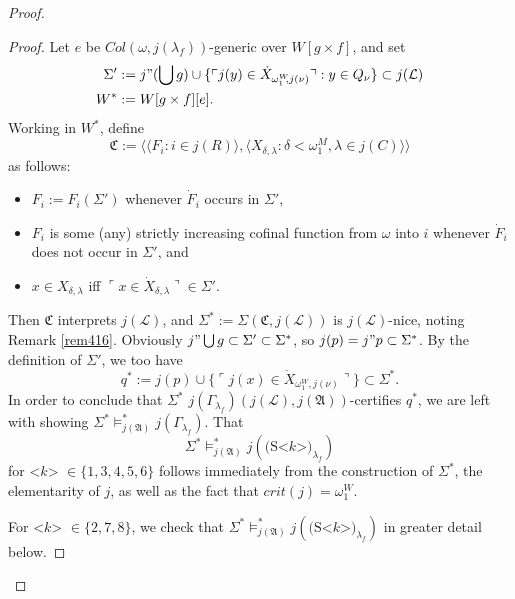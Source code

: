 \documentclass[12pt]{article}
\numberwithin{equation}{section}
\begin{document}
\begin{proof}
\begin{proof}
Let $e$ be $Col(\omega, j(\lambda_f))$-generic over $W[g \times f]$, and set
\begin{align*}
    \Sigma' & := j" (\bigcup g) \cup \{\ulcorner j(y) \in \dot{X}_{\omega_1^W \!\! , j(\nu)} \urcorner : y \in Q_{\nu}\} \subset j(\mathcal{L}) \\
    W^* & := W[g \times f][e] \text{.}
\end{align*} 
Working in $W^*$, define $$\mathfrak{C} := \langle \langle F_i : i \in j(R) \rangle, \langle X_{\delta, \lambda} : \delta < \omega_1^M, \lambda \in j(C) \rangle \rangle$$ as follows:
\begin{itemize}
    \item $F_i := F_i(\Sigma')$ whenever $\dot{F}_i$ occurs in $\Sigma'$,
    \item $F_i$ is some (any) strictly increasing cofinal function from $\omega$ into $i$ whenever $\dot{F}_i$ does not occur in $\Sigma'$, and
    \item $x \in X_{\delta, \lambda}$ iff $\ulcorner x \in \dot{X}_{\delta, \lambda} \urcorner \in \Sigma'$.
\end{itemize}
Then $\mathfrak{C}$ interprets $j(\mathcal{L})$, and $\Sigma^* := \Sigma(\mathfrak{C}, j(\mathcal{L}))$ is $j(\mathcal{L})$-nice, noting Remark \ref{rem416}. Obviously $j" \bigcup g \subset \Sigma' \subset \Sigma^*$, so $j(p) = j" p \subset \Sigma^*$. By the definition of $\Sigma'$, we too have $$q^* := j(p) \cup \{\ulcorner j(x) \in \dot{X}_{\omega_1^W \!\! , j(\nu)} \urcorner\} \subset \Sigma^*.$$ In order to conclude that $\Sigma^*$ $j(\Gamma_{\lambda_f})(j(\mathcal{L}), j(\mathfrak{A}))$-certifies $q^*$, we are left with showing $\Sigma^* \models^*_{j(\mathfrak{A})} j(\Gamma_{\lambda_f})$. That $$\Sigma^* \models^*_{j(\mathfrak{A})} j(\text{(S<} k \text{>)}_{\lambda_f})$$ for <$k$> $\in \{1, 3, 4, 5, 6\}$ follows immediately from the construction of $\Sigma^*$, the elementarity of $j$, as well as the fact that $crit(j) = \omega_1^W$.

For <$k$> $\in \{2, 7, 8\}$, we check that $\Sigma^* \models^*_{j(\mathfrak{A})} j(\text{(S<} k \text{>)}_{\lambda_f})$ in greater detail below. 


\end{proof}
\end{proof}
\end{document}
